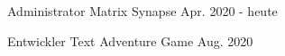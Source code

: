 

\begin{cventries}

  \cventry
    {Administrator} %
    {Matrix Synapse} %
    {} %
    {Apr. 2020 - heute} %
    {
      \begin{cvitems} %
        \item {\lipsum[3][1-2]}
        \item {\lipsum[4][1-3]}
        \item {\lipsum[5][1]}
      \end{cvitems}
    }

  \cventry
    {Entwickler} %
    {Text Adventure Game} %
    {} %
    {Aug. 2020} %
    {
      \begin{cvitems} %
        \item {\lipsum[5][1-3]}
        \item {\lipsum[5][1]}
      \end{cvitems}
    }

\end{cventries}
